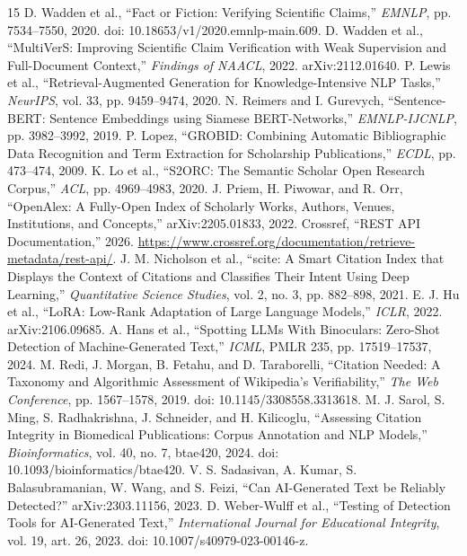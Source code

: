\documentclass[12pt,toc=bib,toc=listof]{scrartcl}
\begin{document}
\label{mainend}
\clearpage
\begin{thebibliography}{15}
\small
{} D. Wadden et al., ``Fact or Fiction: Verifying Scientific Claims,'' \emph{EMNLP}, pp. 7534--7550, 2020. doi: 10.18653/v1/2020.emnlp-main.609.
 D. Wadden et al., ``MultiVerS: Improving Scientific Claim Verification with Weak Supervision and Full-Document Context,'' \emph{Findings of NAACL}, 2022. arXiv:2112.01640.
 P. Lewis et al., ``Retrieval-Augmented Generation for Knowledge-Intensive NLP Tasks,'' \emph{NeurIPS}, vol. 33, pp. 9459--9474, 2020.
 N. Reimers and I. Gurevych, ``Sentence-BERT: Sentence Embeddings using Siamese BERT-Networks,'' \emph{EMNLP-IJCNLP}, pp. 3982--3992, 2019.
 P. Lopez, ``GROBID: Combining Automatic Bibliographic Data Recognition and Term Extraction for Scholarship Publications,'' \emph{ECDL}, pp. 473--474, 2009.
 K. Lo et al., ``S2ORC: The Semantic Scholar Open Research Corpus,'' \emph{ACL}, pp. 4969--4983, 2020.
 J. Priem, H. Piwowar, and R. Orr, ``OpenAlex: A Fully-Open Index of Scholarly Works, Authors, Venues, Institutions, and Concepts,'' arXiv:2205.01833, 2022.
 Crossref, ``REST API Documentation,'' 2026. \url{https://www.crossref.org/documentation/retrieve-metadata/rest-api/}.
 J. M. Nicholson et al., ``scite: A Smart Citation Index that Displays the Context of Citations and Classifies Their Intent Using Deep Learning,'' \emph{Quantitative Science Studies}, vol. 2, no. 3, pp. 882--898, 2021.
 E. J. Hu et al., ``LoRA: Low-Rank Adaptation of Large Language Models,'' \emph{ICLR}, 2022. arXiv:2106.09685.
 A. Hans et al., ``Spotting LLMs With Binoculars: Zero-Shot Detection of Machine-Generated Text,'' \emph{ICML}, PMLR 235, pp. 17519--17537, 2024.
 M. Redi, J. Morgan, B. Fetahu, and D. Taraborelli, ``Citation Needed: A Taxonomy and Algorithmic Assessment of Wikipedia's Verifiability,'' \emph{The Web Conference}, pp. 1567--1578, 2019. doi: 10.1145/3308558.3313618.
 M. J. Sarol, S. Ming, S. Radhakrishna, J. Schneider, and H. Kilicoglu, ``Assessing Citation Integrity in Biomedical Publications: Corpus Annotation and NLP Models,'' \emph{Bioinformatics}, vol. 40, no. 7, btae420, 2024. doi: 10.1093/bioinformatics/btae420.
 V. S. Sadasivan, A. Kumar, S. Balasubramanian, W. Wang, and S. Feizi, ``Can AI-Generated Text be Reliably Detected?'' arXiv:2303.11156, 2023.
 D. Weber-Wulff et al., ``Testing of Detection Tools for AI-Generated Text,'' \emph{International Journal for Educational Integrity}, vol. 19, art. 26, 2023. doi: 10.1007/s40979-023-00146-z.
\end{thebibliography}
\end{document}
